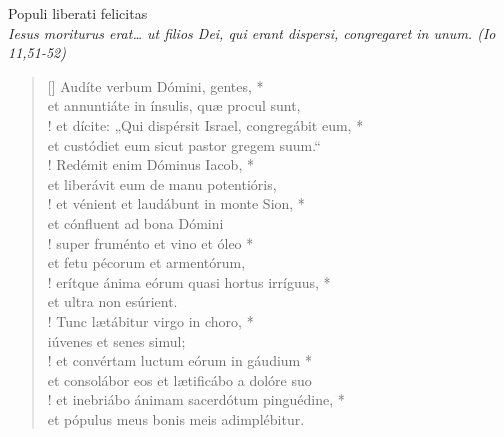 


\def\greinitialformat#1{%
{\fontsize{39}{39}\selectfont #1}%
}




\vspace{0.3cm}
\begin{center}
 
Populi liberati felicitas\\
\textit{\small Iesus moriturus erat… ut filios Dei, qui erant dispersi, congregaret in unum. (Io 11,51-52)}
\end{center}
\begin{verse}[\versewidth]
Audíte verbum Dómini, gentes, *\\
et annuntiáte in ínsulis, quæ procul sunt,\\!
\vin et dícite: „Qui dispérsit Israel, congregábit eum, *\\
\vin et custódiet eum sicut pastor gregem suum.“\\!
Redémit enim Dóminus Iacob, *\\
et liberávit eum de manu potentióris,\\!
\vin et vénient et laudábunt in monte Sion, *\\
\vin et cónfluent ad bona Dómini\\!
super fruménto et vino et óleo *\\
et fetu pécorum et armentórum,\\!
\vin erítque ánima eórum quasi hortus irríguus, *\\
\vin et ultra non esúrient.\\!
Tunc lætábitur virgo in choro, *\\
iúvenes et senes simul;\\!
\vin et convértam luctum eórum in gáudium *\\
\vin et consolábor eos et lætificábo a dolóre suo\\!
et inebriábo ánimam sacerdótum pinguédine, *\\
et pópulus meus bonis meis adimplébitur.\\
\end{verse}
\vspace{1cm}


